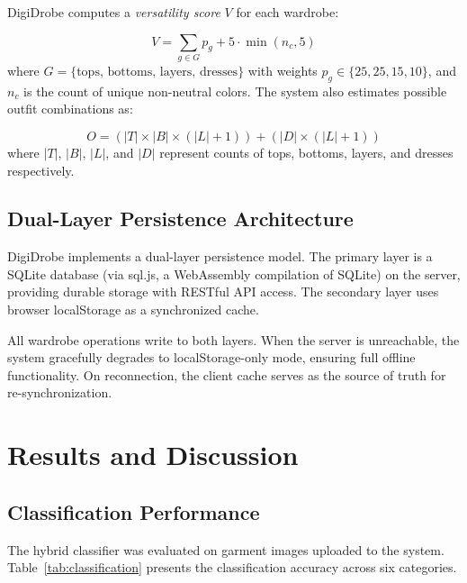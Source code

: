 \documentclass[conference]{IEEEtran}
\begin{document}
DigiDrobe computes a \textit{versatility score} $V$ for each wardrobe:

\begin{equation}
    V = \sum_{g \in G} p_g + 5 \cdot \min(n_c, 5)
\end{equation}
where $G = \{\text{tops, bottoms, layers, dresses}\}$ with weights $p_g \in \{25, 25, 15, 10\}$, and $n_c$ is the count of unique non-neutral colors. The system also estimates possible outfit combinations as:

\begin{equation}
    O = (|T| \times |B| \times (|L| + 1)) + (|D| \times (|L| + 1))
\end{equation}
where $|T|$, $|B|$, $|L|$, and $|D|$ represent counts of tops, bottoms, layers, and dresses respectively.

\subsection{Dual-Layer Persistence Architecture}

DigiDrobe implements a dual-layer persistence model. The primary layer is a SQLite database (via sql.js, a WebAssembly compilation of SQLite) on the server, providing durable storage with RESTful API access. The secondary layer uses browser localStorage as a synchronized cache.

All wardrobe operations write to both layers. When the server is unreachable, the system gracefully degrades to localStorage-only mode, ensuring full offline functionality. On reconnection, the client cache serves as the source of truth for re-synchronization.

\section{Results and Discussion}

\subsection{Classification Performance}

The hybrid classifier was evaluated on garment images uploaded to the system. Table~\ref{tab:classification} presents the classification accuracy across six categories.
\end{document}
